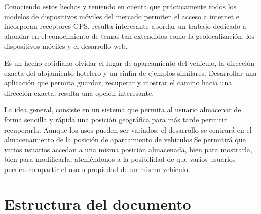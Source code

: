
Conociendo estos hechos y teniendo en cuenta que prácticamente todos los modelos de dispositivos móviles del mercado permiten el acceso a internet e incorporan receptores \ac{GPS}, resulta interesante abordar un trabajo dedicado a ahondar en el conocimiento de temas tan extendidos como la geolocalización, los dispositivos móviles y el desarrollo web.

Es un hecho cotidiano olvidar el lugar de aparcamiento del vehículo, la dirección exacta del alojamiento hotelero y un sinfín de ejemplos similares. Desarrollar una aplicación que permita guardar, recuperar y mostrar el camino hacia una dirección exacta, resulta una opción interesante.

La idea general, consiste en un sistema que permita al usuario almacenar de forma sencilla y rápida una posición geográfica para más tarde permitir recuperarla. Aunque los usos pueden ser variados, el desarrollo se centrará en el almacenamiento de la posición de aparcamiento de vehículos.Se permitirá que varios usuarios accedan a una misma posición almacenada, bien para mostrarla, bien para modificarla, ateniéndonos a la posibilidad de que varios usuarios pueden compartir el uso o propiedad de un mismo vehículo.

\section{Estructura del documento}

